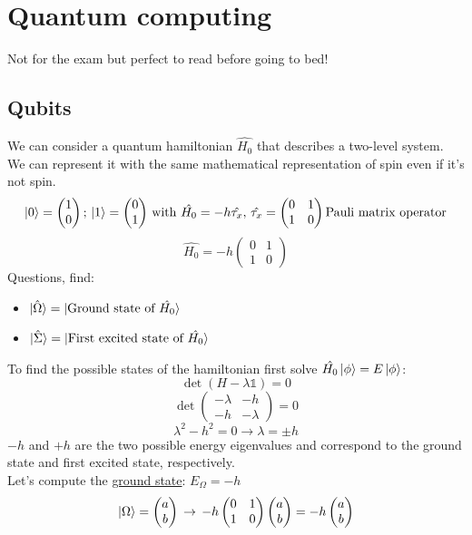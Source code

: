\graphicspath{{chapters/08}}
\chapter{Quantum computing}
Not for the exam but perfect to read before going to bed!
\section{Qubits}
We can consider a quantum hamiltonian $\hat{H_0}$ that describes a two-level system. We can represent it with the same mathematical representation of spin even if it's not spin.
\[
\ket{0}=\begin{pmatrix}1\\0\end{pmatrix};\,
\ket{1}=\begin{pmatrix}0\\1\end{pmatrix}\,
\text{with}\,
\,\hat{H_0}=-h\hat{\tau_x},\,
\hat{\tau_x}=\begin{pmatrix}0&1\\1&0\end{pmatrix}
\text{Pauli matrix operator}
\]
\[
\hat{H_0}=-h\begin{pmatrix}0&1\\1&0\end{pmatrix}
\]
Questions, find:
\begin{itemize}
	\item$\ket{\hat{\Omega}}=\ket{\text{Ground state of }\hat{H_0}}$
	\item$\ket{\hat{\Sigma}}=\ket{\text{First excited state of }\hat{H_0}}$
\end{itemize}
To find the possible states of the hamiltonian first solve $\hat{H_0}\ket{\phi}=E\ket{\phi}$:
\[\det(H-\lambda \mathbb{1})=0\]
\[\det\begin{pmatrix}-\lambda&-h\\-h&-\lambda\end{pmatrix}=0\]
\[\lambda^2-h^2=0 \rightarrow \lambda=\pm h\]
$-h$ and $+h$ are the two possible energy eigenvalues and correspond to the ground state and first excited state, respectively.\\
Let's compute the \ul{ground state}: $E_\Omega=-h$
\[\ket{\Omega}=\begin{pmatrix}a\\b\end{pmatrix}\,\rightarrow\,
-h\begin{pmatrix}0&1\\1&0\end{pmatrix}\begin{pmatrix}a\\b\end{pmatrix}=-h\begin{pmatrix}a\\b\end{pmatrix}\]
